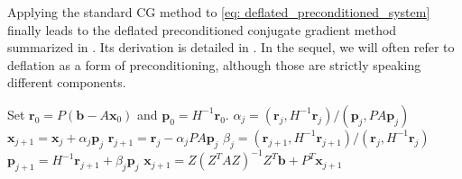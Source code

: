 \documentclass{article}
\numberwithin{equation}{section}
\theoremstyle{definition}
\begin{document}
Applying the standard CG method to \eqref{eq: deflated_preconditioned_system} finally leads to the deflated preconditioned conjugate gradient method summarized in . Its derivation is detailed in . In the sequel, we will often refer to deflation as a form of preconditioning, although those are strictly speaking different components.

\begin{algorithm}[H]
\begin{algorithmic}[1]
\caption{Deflated Preconditioned Conjugate Gradient (DPCG) \cite[Algorithm 1]{vermolen2004deflation}}
\label{algo: dpcg}
\State Set $\bm{r}_0=P(\bm{b}-A\bm{x}_0)$ and $\bm{p}_0=H^{-1}\bm{r}_0$.
    \State $\alpha_j = (\bm{r}_j,H^{-1}\bm{r}_j)/(\bm{p}_j,PA\bm{p}_j)$
    \State $\bm{x}_{j+1}=\bm{x}_j+\alpha_j\bm{p}_j$
    \State $\bm{r}_{j+1}=\bm{r}_j-\alpha_jPA\bm{p}_j$
    \State $\beta_j=(\bm{r}_{j+1},H^{-1}\bm{r}_{j+1})/(\bm{r}_j,H^{-1}\bm{r}_j)$
    \State $\bm{p}_{j+1}=H^{-1}\bm{r}_{j+1}+\beta_j \bm{p}_j$
\EndFor
\State $\bm{x}_{j+1} = Z(Z^TAZ)^{-1}Z^T\bm{b} + P^T\bm{x}_{j+1}$
\end{algorithmic}
\end{algorithm}
\end{document}
